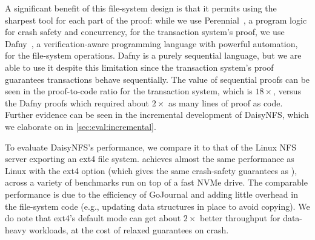 A significant benefit of this file-system design is that it permits using the
sharpest tool for each part of the proof: while we use
Perennial~\cite{chajed:gojournal}, a program logic for crash safety and concurrency, for the
transaction system's proof, we use Dafny~\cite{leino:dafny}, a verification-aware
programming language with powerful automation, for the file-system operations.
Dafny is a purely sequential language, but we are able to use it despite this
limitation since the transaction system's proof guarantees transactions behave
sequentially. The value of
sequential proofs can be seen in the proof-to-code ratio for the transaction
system, which is $18\times$, versus the Dafny proofs which required about
$2\times$ as many lines of proof as code. Further evidence can be seen in the
incremental development of DaisyNFS, which we elaborate on in
\autoref{sec:eval:incremental}.


To evaluate DaisyNFS's performance, we compare it to that of the Linux NFS server
exporting an ext4 file system. \sys achieves almost the same performance as
Linux with the ext4  option (which gives the same crash-safety
guarantees as \sys), across a variety of benchmarks run on top of a fast NVMe
drive. The comparable performance is due to the efficiency of GoJournal and
adding little overhead in the file-system code (e.g., updating data structures
in place to avoid copying). We do note that ext4's default 
mode can get about $2\times$ better throughput for data-heavy workloads, at the
cost of relaxed guarantees on crash.


